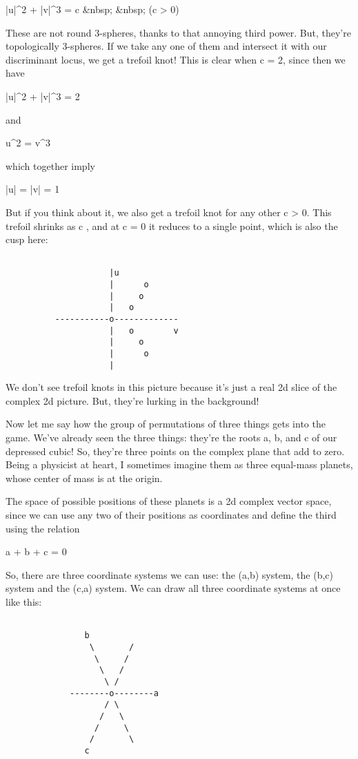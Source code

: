 |u|^{2} + |v|^{3} = c     &nbsp; &nbsp;            (c > 0)

These are not round 3-spheres, thanks to that annoying third power.
But, they're topologically 3-spheres.  If we take any one of them 
and intersect it with our discriminant locus, we get a trefoil knot!  
This is clear when c = 2, since then we have

|u|^{2} + |v|^{3} = 2

and 

u^{2} = v^{3}

which together imply 

|u| = |v| = 1

But if you think about it, we also get a trefoil knot for any other
c > 0.  This trefoil shrinks as c , and at c = 0 it reduces to a 
single point, which is also the cusp here:


\begin{verbatim}

                     |u         
                     |      o
                     |     o
                     |   o
          -----------o-------------
                     |   o        v
                     |     o
                     |      o
                     |          
\end{verbatim}
    
We don't see trefoil knots in this picture because it's just a
real 2d slice of the complex 2d picture.  But, they're lurking in
the background!  

Now let me say how the group of permutations of three things
gets into the game.  We've already seen the three things: they're 
the roots a, b, and c of our depressed cubic!  So, they're three
points on the complex plane that add to zero.  Being a physicist
at heart, I sometimes imagine them as three equal-mass planets, 
whose center of mass is at the origin.

The space of possible positions of these planets is a 2d complex
vector space, since we can use any two of their positions as 
coordinates and define the third using the relation

a + b + c = 0

So, there are three coordinate systems we can use: the (a,b)
system, the (b,c) system and the (c,a) system.  We can draw all 
three coordinate systems at once like this:


\begin{verbatim}

                b         
                 \       /
                  \     /
                   \   /
                    \ /
             --------o--------a
                    / \
                   /   \
                  /     \
                 /       \
                c
\end{verbatim}
    
